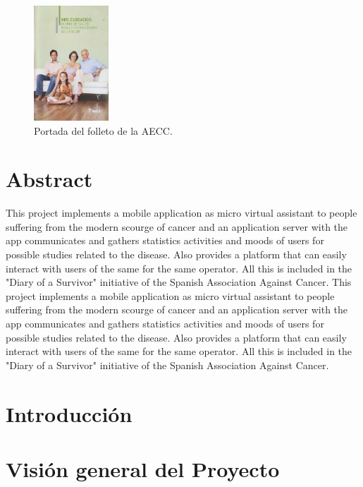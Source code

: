 \documentclass[b5paper,10pt,twoside]{book}
\begin{document}
	\begin{figure}[h]
		\centering
		\includegraphics[width=0.25\textwidth]{fotointro}
		\caption{Portada del folleto de la AECC.}
		\label{fig:mesh1}
	\end{figure}
	 
	\chapter*{Abstract}
	 	This project implements a mobile application as micro virtual assistant to people suffering from the modern scourge of cancer and an application server with the app communicates and gathers statistics activities and moods of users for possible studies related to the disease. Also provides a platform that can easily interact with users of the same for the same operator. All this is included in the "Diary of a Survivor" initiative of the Spanish Association Against Cancer. This project implements a mobile application as micro virtual assistant to people suffering from the modern scourge of cancer and an application server with the app communicates and gathers statistics activities and moods of users for possible studies related to the disease. Also provides a platform that can easily interact with users of the same for the same operator. All this is included in the "Diary of a Survivor" initiative of the Spanish Association Against Cancer.\cite{SHAREESP}
	
	\tableofcontents
	
	\listoffigures
	
	\listoftables
	

	\chapter{Introducción}
	
	
	
	\chapter{Visión general del Proyecto}
\end{document}

